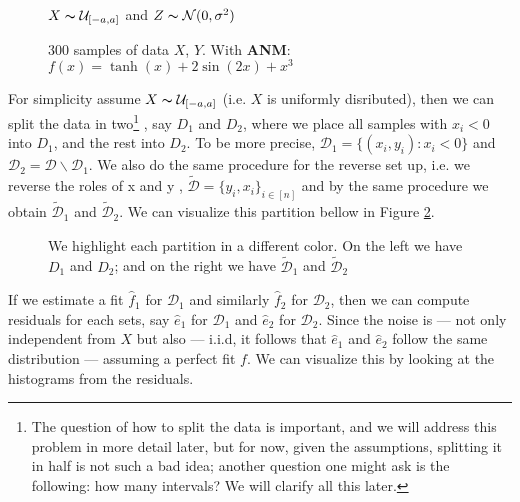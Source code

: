 \begin{figure}[H]
    \captionsetup[subfigure]{labelformat=empty}
    \centering

    \caption{300 samples of data $X$, $Y$. With \textbf{ANM}: \\
    $f(x) = \tanh(x) + 2\sin(2x) + x^3$}
    $X \thicksim \mathcal{U}_{[-a, a]}$ and $Z \thicksim \mathcal{N}(0, \sigma^2)$
    \label{fig:algo_data}
\end{figure}



For simplicity assume $X \thicksim \mathcal{U}_{[-a, a]}$ (i.e. $X$ is uniformly disributed), then we can split 
the data in two\footnote{ The question of how to split the data is important, and we will address this problem in 
more detail later, but for now, given the assumptions, splitting it in half is not such a bad idea; another 
question one might ask is the following: how many intervals? We will clarify all this later.}
, say $D_1$ and $D_2$, where we place all samples with $x_i < 0$ into $D_1$, and the rest into 
$D_2$. To be more precise, $\mathcal{D}_1 = \{(x_i, y_i) : x_i < 0\}$ and $\mathcal{D}_2 = \mathcal{D} 
\backslash \mathcal{D}_1$. We also do the same procedure for the reverse set up, i.e. we reverse the roles of x and y
, $\mathcal{\tilde{D}} = \{y_i, x_i\}_{i \in [n]}$ and by the same procedure we obtain $\mathcal{\tilde{D}}_1$
and $\mathcal{\tilde{D}}_2$. We can visualize this partition bellow in Figure \ref{fig:colo_code}.
 
\begin{figure}[H]
    \captionsetup[subfigure]{labelformat=empty}
    \centering
    \caption{ We highlight each partition in a different color. On the left we have $D_1$ and $D_2$; and on 
    the right we have $\mathcal{\tilde{D}}_1$ and $\mathcal{\tilde{D}}_2$ }
    \label{fig:colo_code}
\end{figure}

If we estimate a fit $\hat{f}_1$ for $\mathcal{D}_1$ and similarly $\hat{f}_2$ for $\mathcal{D}_2$, then we can 
compute residuals for each sets, say $\hat{e}_1$ for $\mathcal{D}_1$  and $\hat{e}_2$ for $\mathcal{D}_2$.
Since the noise is ---  not only independent from $X$ but also ---  i.i.d, it follows that $\hat{e}_1$ and $\hat{e}_2$
follow the same distribution ---  assuming a perfect fit $f$. We can visualize this by looking at the 
histograms from the residuals.


